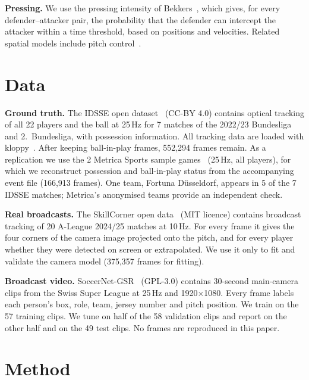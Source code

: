 \documentclass[runningheads]{llncs}
\begin{document}
\textbf{Pressing.} We use the pressing intensity of Bekkers~\cite{bekkers2025pressing}, which gives, for every
defender--attacker pair, the probability that the defender can intercept the attacker within a time threshold, based
on positions and velocities. Related spatial models include pitch control~\cite{spearman2018beyond}.

\section{Data}

\textbf{Ground truth.} The IDSSE open dataset~\cite{bassek2025idsse} (CC-BY 4.0) contains optical tracking of all
22 players and the ball at 25\,Hz for 7 matches of the 2022/23 Bundesliga and 2.~Bundesliga, with possession
information. All tracking data are loaded with kloppy~\cite{kloppy}. After keeping ball-in-play frames, 552{,}294
frames remain. As a replication we use the 2 Metrica Sports
sample games~\cite{metrica_sample} (25\,Hz, all players), for which we reconstruct possession and ball-in-play status
from the accompanying event file (166{,}913 frames). One team, Fortuna D\"usseldorf, appears in 5 of the 7 IDSSE
matches; Metrica's anonymised teams provide an independent check.

\textbf{Real broadcasts.} The SkillCorner open data~\cite{skillcorner_opendata} (MIT licence) contains broadcast
tracking of 20 A-League 2024/25 matches at 10\,Hz. For every frame it gives the four corners of the camera image
projected onto the pitch, and for every player whether they were detected on screen or extrapolated. We use it only to
fit and validate the camera model (375{,}357 frames for fitting).

\textbf{Broadcast video.} SoccerNet-GSR~\cite{somers2024gsr} (GPL-3.0) contains 30-second main-camera clips from the
Swiss Super League at 25\,Hz and 1920$\times$1080. Every frame labels each person's box, role, team, jersey number
and pitch position. We train on the 57 training clips. We tune on half of the 58 validation clips and report on the
other half and on the 49 test clips. No frames are reproduced in this paper.

\section{Method}
\end{document}
